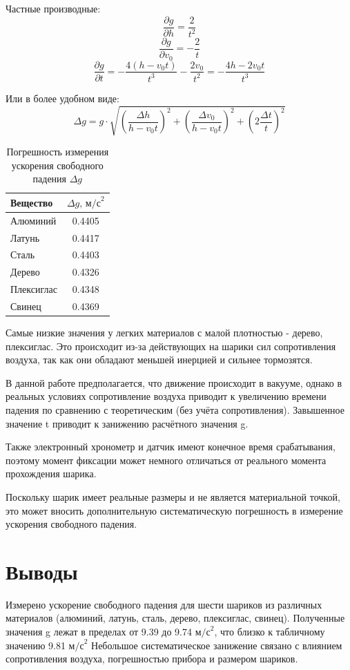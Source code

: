 \documentclass[14pt,a4paper]{extarticle}
\begin{document}
Частные производные:
\[
\frac{\partial g}{\partial h} = \frac{2}{t^2}
\]
\[
\frac{\partial g}{\partial v_0} = -\frac{2}{t}
\]
\[
\frac{\partial g}{\partial t} = -\frac{4(h - v_0 t)}{t^3} - \frac{2v_0}{t^2} = -\frac{4h - 2v_0 t}{t^3}
\]

Или в более удобном виде:
\[
\Delta g = g \cdot \sqrt{ \left( \frac{\Delta h}{h - v_0 t} \right)^2 + \left( \frac{\Delta v_0}{h - v_0 t} \right)^2 + \left( 2\frac{\Delta t}{t} \right)^2 }
\]

\begin{table}[h!]
\centering
\caption{Погрешность измерения ускорения свободного падения \(\Delta g\)}
\label{tab:delta_g}
\begin{tabular}{|l|c|}

\hline
\textbf{Вещество} & \textbf{\(\Delta g, \, \text{м/с}^2\)} \\
\hline
Алюминий    & 0.4405 \\
\hline
Латунь      & 0.4417\\
\hline
Сталь       & 0.4403\\
\hline
Дерево      & 0.4326\\
\hline
Плексиглас  & 0.4348\\
\hline
Свинец      & 0.4369\\
\hline

\end{tabular}
\end{table}
Самые низкие значения у легких материалов с малой плотностью - дерево, плексиглас. Это происходит из-за действующих на шарики сил сопротивления воздуха, так как они обладают меньшей инерцией и сильнее тормозятся. 

В данной работе предполагается, что движение происходит в вакууме, однако в реальных условиях сопротивление воздуха приводит к увеличению времени падения по сравнению с теоретическим (без учёта сопротивления). Завышенное значение t приводит к занижению расчётного значения g.

Также электронный хронометр и датчик имеют конечное время срабатывания, поэтому момент фиксации может немного отличаться от реального момента прохождения шарика.

Поскольку шарик имеет реальные размеры и не является материальной точкой, это может вносить дополнительную систематическую погрешность в измерение ускорения свободного падения.
\newpage
\section{Выводы}
Измерено ускорение свободного падения для шести шариков из различных материалов (алюминий, латунь, сталь, дерево, плексиглас, свинец). Полученные значения g лежат в пределах от 9.39 до 9.74 \(\text{м/с}^2\), что близко к табличному значению 9.81 \(\text{м/с}^2\)
Небольшое систематическое занижение связано с влиянием сопротивления воздуха, погрешностью прибора и размером шариков.
\end{document}
